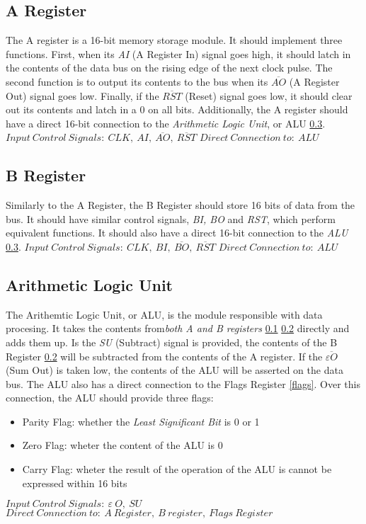 \subsection{A Register} \label{a-reg}
The A register is a 16-bit memory storage module. It should implement three functions. First, when its \emph{AI}
(A Register In) signal goes high, it should latch in the contents of the data bus on the rising edge of the next clock pulse.
The second function is to output its contents to the bus when its \emph{$\overline{AO}$} (A Register Out) signal goes low. Finally,
if the \emph{$\overline{RST}$} (Reset) signal goes low, it should clear out its contents and latch in a 0 on all bits. Additionally,
the A register should have a direct 16-bit connection to the \emph{Arithmetic Logic Unit}, or ALU \ref{alu}. \\
\textbf{$Input\:Control\:Signals:\:CLK,\:AI,\:\overline{AO},\:\overline{RST}$}
\textbf{$Direct\:Connection\:to:\:ALU$}

\subsection{B Register} \label{b-reg}
Similarly to the A Register, the B Register should store 16 bits of data from the bus. It should have similar control signals,
\emph{BI, BO} and \emph{RST}, which perform equivalent functions. It should also have a direct 16-bit connection to the \emph{ALU}
\ref{alu}.
\textbf{$Input\:Control\:Signals:\:CLK,\:BI,\:\overline{BO},\:\overline{RST}$}
\textbf{$Direct\:Connection\:to:\:ALU$}

\subsection{Arithmetic Logic Unit} \label{alu}
The Arithemtic Logic Unit, or ALU, is the module responsible with data procesing. It takes the contents from\emph{both A and B
registers} \ref{a-reg} \ref{b-reg} directly and adds them up. Is the \emph{SU} (Subtract) signal is provided, the contents of the
B Register \ref{b-reg} will be subtracted from the contents of the A register. If the \emph{$\overline{\varepsilon O}$} (Sum Out)
is taken low, the contents of the  ALU will be asserted on the data bus. The ALU also has a direct connection to the Flags Register
\ref{flags}. Over this connection, the ALU should provide three flags:
\begin{itemize}
  \item Parity Flag: whether the \emph{Least Significant Bit} is 0 or 1
  \item Zero Flag: wheter the content of the ALU is 0
  \item Carry Flag: wheter the result of the operation of the ALU is cannot be expressed within 16 bits
\end{itemize}
\textbf{$Input\:Control\:Signals:\:\varepsilon\:O,\:SU$}
\textbf{$Direct\:Connection\:to:\:A\:Register,\:B\:register,\:Flags\:Register$}

